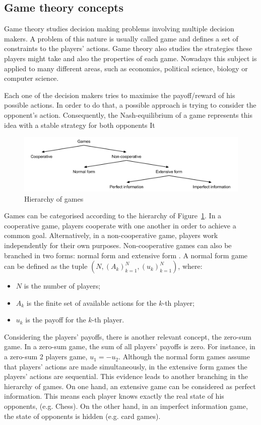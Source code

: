 \subsection{Game theory concepts}

Game theory studies decision making problems involving multiple decision makers.
A problem of this nature is usually called game and defines a set of constraints to the players' actions.
Game theory also studies the strategies these players might take and also the properties of each game.
Nowadays this subject is applied to many different areas, such as economics, political science, biology or computer science.

Each one of the decision makers tries to maximise the payoff/reward of his possible actions.
In order to do that, a possible approach is trying to consider the opponent's action.
Consequently, the Nash-equilibrium of a game represents this idea with a stable strategy for both opponents
It 

\begin{figure}
\centering
\includegraphics[width=1\textwidth]{./img/gamesHierarchy}
\caption{Hierarchy of games}
\label{fig:games}
\end{figure}

Games can be categorised according to the hierarchy of Figure~\ref{fig:games}.
In a cooperative game, players cooperate with one another in order to achieve a common goal.
Alternatively, in a non-cooperative game, players work independently for their own purposes.
Non-cooperative games can also be branched in two forms: normal form and extensive form \cite{Shoham2010}.
A normal form game can be defined as the tuple $(N,(A_k)_{k=1}^{N},(u_k)_{k=1}^{N})$, where:
\begin{itemize}
\item $N$ is the number of players;
\item $A_k$ is the finite set of available actions for the $k$-th player;
\item $u_k$ is the payoff for the $k$-th player.
\end{itemize}
Considering the players' payoffs, there is another relevant concept, the zero-sum game.
In a zero-sum game, the sum of all players' payoffs is zero.
For instance, in a zero-sum 2 players game, $u_1 = -u_2$.
Although the normal form games assume that players' actions are made simultaneously, in the extensive form games the players' actions are sequential.
This evidence leads to another branching in the hierarchy of games.
On one hand, an extensive game can be considered as perfect information.
This means each player knows exactly the real state of his opponents, (e.g. Chess).
On the other hand, in an imperfect information game, the state of opponents is hidden (e.g. card games).

